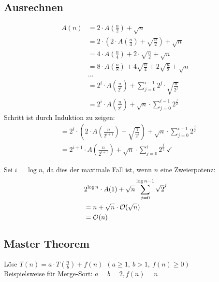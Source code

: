 \subsection{Ausrechnen} 
\begin{align*}
A(n) &= 2 \cdot A\left(\frac{n}{2}\right) + \sqrt{n} \\
&= 2\cdot \left( 2 \cdot A\left(\frac{n}{4}\right) + \sqrt{\frac{n}{2}} \right) + \sqrt{n} \\
&= 4 \cdot A\left(\frac{n}{4}\right) + 2 \cdot \sqrt{\frac{n}{2}} + \sqrt{n} \\
&= 8 \cdot A\left(\frac{n}{8}\right) + 4 \sqrt{\frac{n}{4}} + 2 \sqrt{\frac{n}{2}} + \sqrt{n} \\
&\ldots \\
&= 2^i \cdot A \left( \frac{n}{2^i}\right) + \sum \limits_{j=0}^{i-1} 2^j \cdot \sqrt{\frac{n}{2^j}}  \ \tag{i-ter Schritt}\\
&= 2^i \cdot A\left(\frac{n}{2^i}\right) + \sqrt{n} \cdot \sum \limits_{j=0}^{i-1} 2^{\frac{j}{2}} 
\end{align*}
Schritt ist durch Induktion zu zeigen:
\begin{align*}
&= 2^i \cdot \left(2\cdot A\left(\frac{n}{2^{i+1}}\right) +\sqrt{\frac{1}{2^i}}\right) 
+ \sqrt{n} \cdot \sum \limits_{j=0}^{i-1} 2^{\frac{j}{2}}\\
&=2^{i+1}\cdot A\left(\frac{n}{2^{i+1}}\right) + \sqrt{n} \cdot \sum \limits_{j=0}^{i} 2^{\frac{j}{2}} \ \checkmark
\end{align*}

Sei $i = \log n$, da dies der maximale Fall ist, wenn $n$ eine Zweierpotenz: 
\begin{align*}
&2^{\log n} \cdot A(1) + \sqrt{n} \sum \limits_{j=0}^{\log n-1} \sqrt{2}^j \\
&= n + \sqrt{n} \cdot \mathcal{O}(\sqrt{n}) \\
&= \mathcal{O}(n)
\end{align*}

\subsection{Master Theorem}
Löse $T(n) = a \cdot T(\frac{n}{b}) + f(n) \ \ (a \geq 1,\ b > 1,\  f(n) \geq 0)$ \\
Beispielsweise für Merge-Sort: $a=b=2, f(n) = n$ \\

